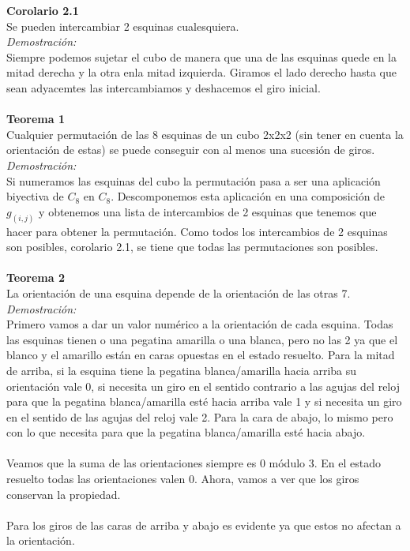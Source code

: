 \documentclass{article}
\begin{document}
\textbf{Corolario 2.1}\\
Se pueden intercambiar 2 esquinas cualesquiera.\\
\textit{Demostración:}\\
Siempre podemos sujetar el cubo de manera que una de las esquinas quede en la mitad derecha y la otra enla mitad izquierda. Giramos el lado derecho hasta que sean adyacemtes las intercambiamos y deshacemos el giro inicial.\\\\
\noindent\textbf{Teorema 1}\\
Cualquier permutación de las 8 esquinas de un cubo 2x2x2 (sin tener en cuenta la orientación de estas) se puede conseguir con al menos una sucesión de giros.\\
\textit{Demostración:}\\
Si numeramos las esquinas del cubo la permutación pasa a ser una aplicación biyectiva de $C_8$ en $C_8$. Descomponemos esta aplicación en una composición de $g_{(i,j)}$ y obtenemos una lista de intercambios de 2 esquinas que tenemos que hacer para obtener la permutación. Como todos los intercambios de 2 esquinas son posibles, corolario 2.1, se tiene que todas las permutaciones son posibles.\\\\
\textbf{Teorema 2}\\
La orientación de una esquina depende de la orientación de las otras 7.\\
\textit{Demostración:}\\
Primero vamos a dar un valor numérico a la orientación de cada esquina. Todas las esquinas tienen o una pegatina amarilla o una blanca, pero no las 2 ya que el blanco y el amarillo están en caras opuestas en el estado resuelto. Para la mitad de arriba, si la esquina tiene la pegatina blanca/amarilla hacia arriba su orientación vale 0, si necesita un giro en el sentido contrario a las agujas del reloj para que la pegatina blanca/amarilla esté hacia arriba vale 1 y si necesita un giro en el sentido de las agujas del reloj vale 2. Para la cara de abajo, lo mismo pero con lo que necesita para que la pegatina blanca/amarilla esté hacia abajo.\\\\
Veamos que la suma de las orientaciones siempre es 0 módulo 3. En el estado resuelto todas las orientaciones valen 0. Ahora, vamos a ver que los giros conservan la propiedad.\\\\
Para los giros de las caras de arriba y abajo es evidente ya que estos no afectan a la orientación.\\\\
\end{document}
